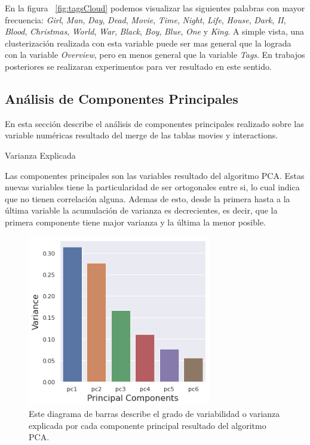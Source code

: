 \documentclass[11pt,a4paper,twoside]{thesis}
\begin{document}
En la figura ~\ref{fig:tagsCloud} podemos visualizar las siguientes palabras
con mayor frecuencia: \textit{Girl}, \textit{Man}, \textit{Day}, \textit{Dead},
\textit{Movie}, \textit{Time}, \textit{Night}, \textit{Life}, \textit{House},
\textit{Dark}, \textit{II}, \textit{Blood}, \textit{Christmas}, \textit{World},
\textit{War}, \textit{Black}, \textit{Boy}, \textit{Blue}, \textit{One} y
\textit{King}. A simple vista, una clusterización realizada con esta variable
puede ser mas general que la lograda con la variable \textit{Overview}, pero en
menos general que la variable \textit{Tags}. En trabajos posteriores se
realizaran experimentos para ver resultado en este sentido.

\clearpage

\subsection{Análisis de Componentes Principales}

En esta sección describe el análisis de componentes principales realizado sobre
las variable numéricas resultado del merge de las tablas movies y interactions.

\begin{description}
	\item[Varianza Explicada]
\end{description}

Las componentes principales son las variables resultado del algoritmo PCA.
Estas nuevas variables tiene la particularidad de ser ortogonales entre si, lo
cual indica que no tienen correlación alguna. Ademas de esto, desde la primera
hasta a la última variable la acumulación de varianza es decrecientes, es
decir, que la primera componente tiene major varianza y la última la menor
posible.

\begin{figure}[h!]
	\centering
	\includegraphics[width=8cm]{./images/PCA-Variance.png}
	\caption{Este diagrama de barras describe el grado de variabilidad o varianza explicada por cada componente principal resultado del algoritmo PCA.}
	\label{fig:explainedVariancePlot}
\end{figure}
\end{document}
